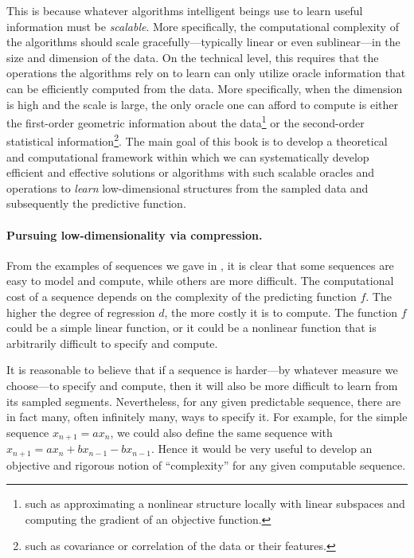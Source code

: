 \documentclass[../../book-main.tex]{subfiles}
\begin{document}
This is because whatever algorithms intelligent beings use to learn useful information must be \textit{scalable}. More specifically, the computational complexity of the algorithms should scale gracefully---typically linear or even sublinear---in the size and dimension of the data. On the technical level, this requires that the operations the algorithms rely on to learn can only utilize oracle information that can be efficiently computed from the data. More specifically, when the dimension is high and the scale is large, the only oracle one can afford to compute is either the first-order geometric information about the data\footnote{such as approximating a nonlinear structure locally with linear subspaces and computing the gradient of an objective function.} or the second-order statistical information\footnote{such as covariance or correlation of the data or their features.}.
The main goal of this book is to develop a theoretical and computational framework within which we can systematically develop efficient and effective solutions or algorithms with such scalable oracles and operations to \textit{learn} low-dimensional structures from the sampled data and subsequently the predictive function.


\paragraph{Pursuing low-dimensionality via compression.}
From the examples of sequences we gave in , it is clear that some sequences are easy to model and compute, while others are more difficult. The computational cost of a sequence depends on the complexity of the predicting function \(f\). The higher the degree of regression \(d\), the more costly it is to compute. The function \(f\) could be a simple linear function, or it could be a nonlinear function that is arbitrarily difficult to specify and compute.

It is reasonable to believe that if a sequence is harder---by whatever measure we choose---to specify and compute, then it will also be more difficult to learn from its sampled segments. Nevertheless, for any given predictable sequence, there are in fact many, often infinitely many, ways to specify it. For example, for the simple sequence \(x_{n+1} = a x_{n}\), we could also define the same sequence with \(x_{n+1} = a x_{n} + b x_{n-1} - b x_{n-1}\).
Hence it would be very useful to develop an objective and rigorous notion of ``complexity'' for any given computable sequence.
\end{document}
